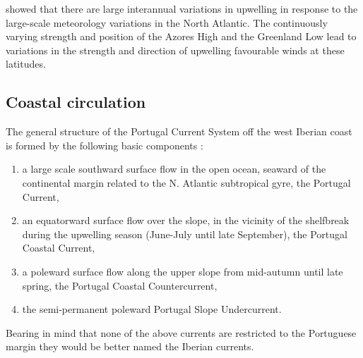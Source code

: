 \citet{Blanton87} showed that there are large interannual
variations in upwelling in response to the large-scale meteorology
variations in the North Atlantic. The continuously varying
strength and position of the Azores High and the Greenland Low
lead to variations in the strength and direction of upwelling
favourable winds at these latitudes.

\subsection{Coastal circulation} The general structure of the
Portugal Current System off the west Iberian coast is formed by
the following basic components \citep{Fiuza96b}:
\begin{enumerate}
  \item  a large scale southward surface flow in the open ocean,
  seaward of the continental margin related to the N. Atlantic
  subtropical gyre, the Portugal Current,
  \item an equatorward surface flow over the slope, in the
  vicinity of the shelfbreak during the upwelling season
  (June-July until late September), the Portugal Coastal Current,
  \item a poleward surface flow along the upper slope from
mid-autumn until late spring, the Portugal Coastal Countercurrent,
  \item the semi-permanent poleward Portugal Slope Undercurrent.
\end{enumerate}
Bearing in mind that none of the above currents are restricted to
the Portuguese margin they would be better named the Iberian
currents.
